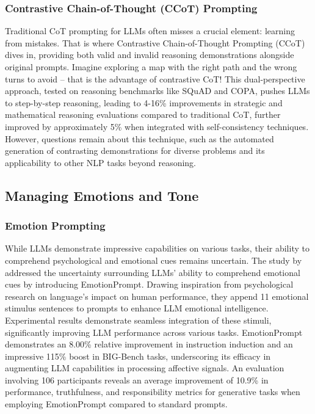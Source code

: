\documentclass{article}
\begin{document}
\subsubsection{Contrastive Chain-of-Thought (CCoT) Prompting}
\label{ccot}
Traditional CoT prompting for LLMs often misses a crucial element: learning from mistakes. That is where Contrastive Chain-of-Thought Prompting (CCoT)~\citep{chia2023contrastive} dives in, providing both valid and invalid reasoning demonstrations alongside original prompts. Imagine exploring a map with the right path and the wrong turns to avoid – that is the advantage of contrastive CoT! This dual-perspective approach, tested on reasoning benchmarks like SQuAD and COPA, pushes LLMs to step-by-step reasoning, leading to 4-16\% improvements in strategic and mathematical reasoning evaluations compared to traditional CoT, further improved by approximately 5\% when integrated with self-consistency techniques. However, questions remain about this technique, such as the automated generation of contrasting demonstrations for diverse problems and its applicability to other NLP tasks beyond reasoning.
\subsection{Managing Emotions and Tone}
\label{met}
\subsubsection{Emotion Prompting} 
\label{EP}
While LLMs demonstrate impressive capabilities on various tasks, their ability to comprehend psychological and emotional cues remains uncertain. The study by~\cite{li2023large} addressed the uncertainty surrounding LLMs' ability to comprehend emotional cues by introducing EmotionPrompt. Drawing inspiration from psychological research on language's impact on human performance, they append 11 emotional stimulus sentences to prompts to enhance LLM emotional intelligence. Experimental results demonstrate seamless integration of these stimuli, significantly improving LLM performance across various tasks. EmotionPrompt demonstrates an 8.00\% relative improvement in instruction induction and an impressive 115\% boost in BIG-Bench tasks, underscoring its efficacy in augmenting LLM capabilities in processing affective signals. An evaluation involving 106 participants reveals an average improvement of 10.9\% in performance, truthfulness, and responsibility metrics for generative tasks when employing EmotionPrompt compared to standard prompts.
\end{document}
